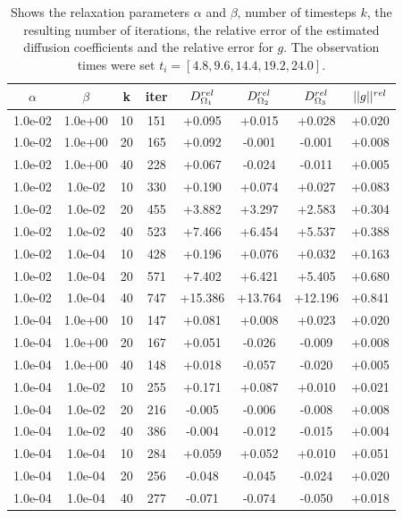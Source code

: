 \documentclass[11pt,a4paper]{article}
\begin{document}
\begin{table}
\centering
\caption{ Shows the relaxation parameters $\alpha$ and $\beta$, number of timesteps $k$, the resulting number of iterations, the relative error of the estimated diffusion coefficients and the relative error for $g$. The observation times were set $t_i = [ 4.8, 9.6, 14.4, 19.2, 24.0 ] $. }
\begin{tabular}{*{8}c}
$\alpha$ & $\beta$ & k & iter & $ D_{\Omega_1}\sp{rel}$& $D_{\Omega_2}\sp{rel} $ & $D_{\Omega_3}\sp{rel} $&$|| g ||\sp{rel} $ \\
\hline
 1.0e-02 	 & 1.0e+00 	 & 10 & 151 	 & +0.095 & +0.015 & +0.028 & +0.020 \\ 
 1.0e-02 	 & 1.0e+00 	 & 20 & 165 	 & +0.092 & -0.001 & -0.001 & +0.008 \\ 
 1.0e-02 	 & 1.0e+00 	 & 40 & 228 	 & +0.067 & -0.024 & -0.011 & +0.005 \\ 
 
 1.0e-02 	 & 1.0e-02 	 & 10 & 330 	 & +0.190 & +0.074 & +0.027 & +0.083 \\ 
 1.0e-02 	 & 1.0e-02 	 & 20 & 455 	 & +3.882 & +3.297 & +2.583 & +0.304 \\ 
  1.0e-02 	 & 1.0e-02 	 & 40 & 523 	 & +7.466 & +6.454 & +5.537 & +0.388 \\ 

 1.0e-02 	 & 1.0e-04 	 & 10 & 428 	 & +0.196 & +0.076 & +0.032 & +0.163 \\ 
 1.0e-02 	 & 1.0e-04 	 & 20 & 571 	 & +7.402 & +6.421 & +5.405 & +0.680 \\ 
 1.0e-02 	 & 1.0e-04 	 & 40 & 747 	 & +15.386 & +13.764 & +12.196 & +0.841 \\ 
  
  1.0e-04 	 & 1.0e+00 	 & 10 & 147 	 & +0.081 & +0.008 & +0.023 & +0.020 \\ 
  1.0e-04 	 & 1.0e+00 	 & 20 & 167 	 & +0.051 & -0.026 & -0.009 & +0.008 \\ 
  1.0e-04 	 & 1.0e+00 	 & 40 & 148 	 & +0.018 & -0.057 & -0.020 & +0.005 \\ 
  
 1.0e-04 	 & 1.0e-02 	 & 10 & 255 	 & +0.171 & +0.087 & +0.010 & +0.021 \\ 
 1.0e-04 	 & 1.0e-02 	 & 20 & 216 	 & -0.005 & -0.006 & -0.008 & +0.008 \\ 
 1.0e-04 	 & 1.0e-02 	 & 40 & 386 	 & -0.004 & -0.012 & -0.015 & +0.004 \\ 
  
  
 1.0e-04 	 & 1.0e-04 	 & 10 & 284 	 & +0.059 & +0.052 & +0.010 & +0.051 \\ 
 1.0e-04 	 & 1.0e-04 	 & 20 & 256 	 & -0.048 & -0.045 & -0.024 & +0.020 \\ 
  1.0e-04 	 & 1.0e-04 	 & 40 & 277 	 & -0.071 & -0.074 & -0.050 & +0.018 \\ 
  

\end{tabular}
\end{table}
\end{document}

